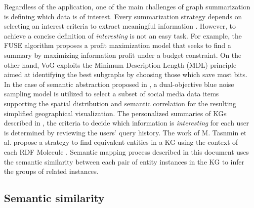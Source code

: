 \documentclass{ieeeaccess}
\begin{document}
Regardless of the application, one of the main challenges of
graph summarization is defining which data is of interest. Every
summarization strategy depends on selecting an interest criteria to
extract meaningful information \cite{liu2018graph}. However, to achieve a 
concise definition of \textit{interesting} is not an easy task. For
example, the FUSE algorithm \cite {Seah12} proposes a profit maximization
model that seeks to find a summary by maximizing information profit under
a budget constraint. On the other hand, VoG \cite{koutra2014vog} exploits
the Minimum Description Length (MDL) principle aimed at identifying the
best subgraphs by choosing those which save most bits. In the case of
semantic abstraction proposed in \cite{8801911}, a dual-objective blue 
noise sampling model is utilized to select a subset of social media data
items supporting the spatial distribution and semantic correlation for
the resulting simplified geographical visualization. The personalized 
summaries of KGs described in \cite{Koutra2019}, the criteria to decide 
which information is \textit{interesting} for each user is determined by
reviewing the users' query history. The work of M. Tasnmin et al. 
propose a strategy to find equivalent entities in a KG using the context 
of each RDF Molecule \cite{Tasnim2020}. Semantic mapping process described
in this document uses the semantic similarity between each pair of entity
instances in the KG to infer the groups of related instances.

\subsection{Semantic similarity}
\end{document}
